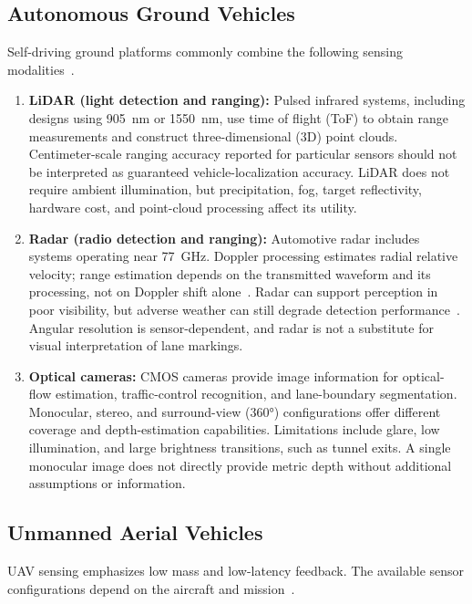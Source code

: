 \documentclass[11pt,a4paper]{article}
\begin{document}
\subsection{Autonomous Ground Vehicles}
Self-driving ground platforms commonly combine the following sensing modalities~\cite{yeong2021}.

\begin{enumerate}
    \item \textbf{LiDAR (light detection and ranging):}
    Pulsed infrared systems, including designs using \SI{905}{\nano\metre} or \SI{1550}{\nano\metre}, use time of flight (ToF) to obtain range measurements and construct three-dimensional (3D) point clouds. Centimeter-scale ranging accuracy reported for particular sensors should not be interpreted as guaranteed vehicle-localization accuracy. LiDAR does not require ambient illumination, but precipitation, fog, target reflectivity, hardware cost, and point-cloud processing affect its utility.

    \item \textbf{Radar (radio detection and ranging):}
    Automotive radar includes systems operating near \SI{77}{\giga\hertz}. Doppler processing estimates radial relative velocity; range estimation depends on the transmitted waveform and its processing, not on Doppler shift alone~\cite{tiRadar}. Radar can support perception in poor visibility, but adverse weather can still degrade detection performance~\cite{weather2023}. Angular resolution is sensor-dependent, and radar is not a substitute for visual interpretation of lane markings.

    \item \textbf{Optical cameras:}
    CMOS cameras provide image information for optical-flow estimation, traffic-control recognition, and lane-boundary segmentation. Monocular, stereo, and surround-view (\ang{360}) configurations offer different coverage and depth-estimation capabilities. Limitations include glare, low illumination, and large brightness transitions, such as tunnel exits. A single monocular image does not directly provide metric depth without additional assumptions or information.
\end{enumerate}

\subsection{Unmanned Aerial Vehicles}
UAV sensing emphasizes low mass and low-latency feedback. The available sensor configurations depend on the aircraft and mission~\cite{chang2023}.
\end{document}
